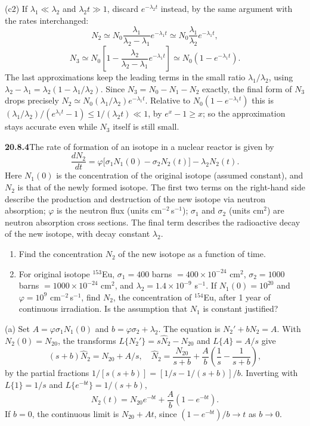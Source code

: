 (c2) If $\lambda_1\ll\lambda_2$ and $\lambda_2t\gg1$,
discard $e^{-\lambda_2t}$ instead, by the same argument with
the rates interchanged:
\[
N_2\simeq N_0\frac{\lambda_1}{\lambda_2-\lambda_1}e^{-\lambda_1t}
\simeq N_0\frac{\lambda_1}{\lambda_2}e^{-\lambda_1t},
\]
\[
N_3\simeq N_0\left[1-
\frac{\lambda_2}{\lambda_2-\lambda_1}e^{-\lambda_1t}\right]
\simeq N_0(1-e^{-\lambda_1t}).
\]
The last approximations keep the leading terms in the small
ratio $\lambda_1/\lambda_2$, using
$\lambda_2-\lambda_1=\lambda_2(1-\lambda_1/\lambda_2)$.
Since $N_3=N_0-N_1-N_2$ exactly, the final form of $N_3$ drops
precisely $N_2\simeq N_0(\lambda_1/\lambda_2)e^{-\lambda_1t}$.
Relative to $N_0(1-e^{-\lambda_1t})$ this is
$(\lambda_1/\lambda_2)/(e^{\lambda_1t}-1)\le1/(\lambda_2t)\ll1$,
by $e^x-1\ge x$; so the approximation stays accurate even while
$N_3$ itself is still small.

\par\bigskip
\noindent\textbf{20.8.4}\quad The rate of formation of an isotope
in a nuclear reactor is given by
\[
\frac{dN_{2}}{dt}=\varphi\big[\sigma_{1}N_{1}(0)
-\sigma_{2}N_{2}(t)\big]-\lambda_{2}N_{2}(t).
\]
Here $N_{1}(0)$ is the concentration of the original isotope
(assumed constant), and $N_{2}$ is that of the newly formed
isotope. The first two terms on the right-hand side describe the
production and destruction of the new isotope via neutron
absorption; $\varphi$ is the neutron flux (units
cm$^{-2}$\,s$^{-1}$); $\sigma_{1}$ and $\sigma_{2}$ (units
cm$^{2}$) are neutron absorption cross sections. The final term
describes the radioactive decay of the new isotope, with decay
constant $\lambda_{2}$.
\begin{enumerate}
\item[(a)] Find the concentration $N_{2}$ of the new isotope as a
function of time.
\item[(b)] For original isotope $^{153}$Eu, $\sigma_{1}=400$
barns $=400\times10^{-24}$ cm$^{2}$, $\sigma_{2}=1000$ barns
$=1000\times10^{-24}$ cm$^{2}$, and
$\lambda_{2}=1.4\times10^{-9}$ s$^{-1}$. If $N_{1}(0)=10^{20}$
and $\varphi=10^{9}$ cm$^{-2}$\,s$^{-1}$, find $N_{2}$, the
concentration of $^{154}$Eu, after 1 year of continuous
irradiation. Is the assumption that $N_{1}$ is constant
justified?
\end{enumerate}
\par{}
\solution
(a) Set $A=\varphi\sigma_1N_1(0)$ and
$b=\varphi\sigma_2+\lambda_2$. The equation is
$N_2'+bN_2=A$. With $N_2(0)=N_{20}$, the transforms
$L\{N_2'\}=s\widehat N_2-N_{20}$ and $L\{A\}=A/s$ give
\[
(s+b)\widehat N_2=N_{20}+A/s,
\quad
\widehat N_2=\frac{N_{20}}{s+b}
+\frac A b\left(\frac1s-\frac1{s+b}\right),
\]
by the partial fractions $1/[s(s+b)]=[1/s-1/(s+b)]/b$.
Inverting with $L\{1\}=1/s$ and $L\{e^{-bt}\}=1/(s+b)$,
\[
\boxed{N_2(t)=N_{20}e^{-bt}+\frac A b(1-e^{-bt})}.
\]
 If $b=0$, the continuous limit is
$N_{20}+At$, since $(1-e^{-bt})/b\to t$ as $b\to0$.


